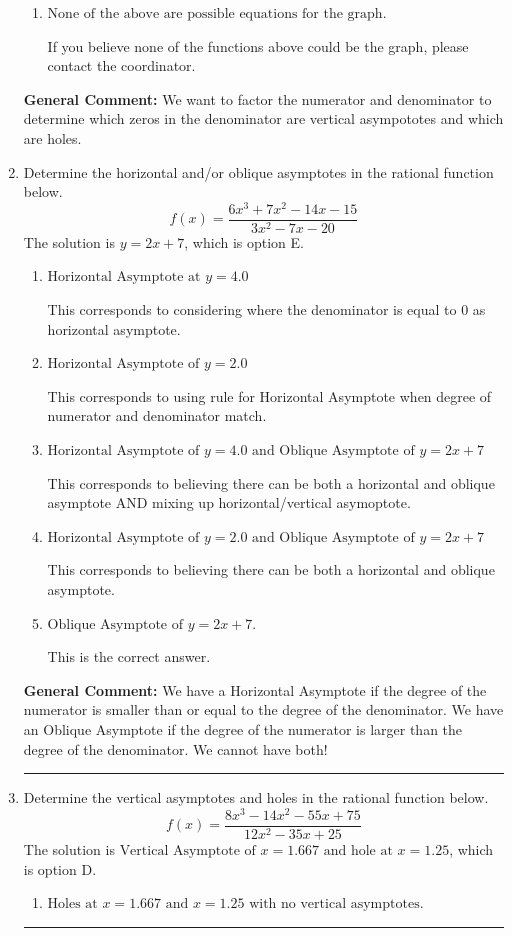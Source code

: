 \documentclass{extbook}[14pt]
\newcommand{\litem}[1]{\item #1

\rule{\textwidth}{0.4pt}}
\begin{document}
\begin{enumerate}
{\begin{enumerate}[label=\Alph*.]
This is the correct answer!
\item \( \text{None of the above are possible equations for the graph.} \)

If you believe none of the functions above could be the graph, please contact the coordinator.
\end{enumerate}

\textbf{General Comment:} We want to factor the numerator and denominator to determine which zeros in the denominator are vertical asympototes and which are holes.
}
\litem{
Determine the horizontal and/or oblique asymptotes in the rational function below.
\[ f(x) = \frac{6x^{3} +7 x^{2} -14 x -15}{3x^{2} -7 x -20} \]The solution is \( y = 2x + 7 \), which is option E.\begin{enumerate}[label=\Alph*.]
\item \( \text{Horizontal Asymptote at } y = 4.0 \)

This corresponds to considering where the denominator is equal to 0 as horizontal asymptote.
\item \( \text{Horizontal Asymptote of } y = 2.0  \)

This corresponds to using rule for Horizontal Asymptote when degree of numerator and denominator match.
\item \( \text{Horizontal Asymptote of } y = 4.0 \text{ and Oblique Asymptote of } y = 2x + 7 \)

This corresponds to believing there can be both a horizontal and oblique asymptote AND mixing up horizontal/vertical asymoptote.
\item \( \text{Horizontal Asymptote of } y = 2.0 \text{ and Oblique Asymptote of } y = 2x + 7 \)

This corresponds to believing there can be both a horizontal and oblique asymptote.
\item \( \text{Oblique Asymptote of } y = 2x + 7. \)

This is the correct answer.
\end{enumerate}

\textbf{General Comment:} We have a Horizontal Asymptote if the degree of the numerator is smaller than or equal to the degree of the denominator. We have an Oblique Asymptote if the degree of the numerator is larger than the degree of the denominator. We cannot have both!
}
\litem{
Determine the vertical asymptotes and holes in the rational function below.
\[ f(x) = \frac{8x^{3} -14 x^{2} -55 x + 75}{12x^{2} -35 x + 25} \]The solution is \( \text{Vertical Asymptote of } x = 1.667 \text{ and hole at } x = 1.25 \), which is option D.\begin{enumerate}[label=\Alph*.]
\item \( \text{Holes at } x = 1.667 \text{ and } x = 1.25 \text{ with no vertical asymptotes.} \)


\end{enumerate}}
\end{enumerate}
\end{document}
